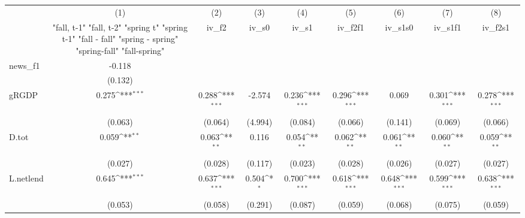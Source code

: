 {
\def\sym#1{\ifmmode^{#1}\else\(^{#1}\)\fi}
\begin{tabular}{l*{8}{c}}
\toprule
            &\multicolumn{1}{c}{(1)}&\multicolumn{1}{c}{(2)}&\multicolumn{1}{c}{(3)}&\multicolumn{1}{c}{(4)}&\multicolumn{1}{c}{(5)}&\multicolumn{1}{c}{(6)}&\multicolumn{1}{c}{(7)}&\multicolumn{1}{c}{(8)}\\
            &\multicolumn{1}{c}{  "fall, t-1" "fall, t-2" "spring t" "spring t-1"  "fall - fall" "spring - spring" "spring-fall" "fall-spring" }&\multicolumn{1}{c}{iv\_f2}&\multicolumn{1}{c}{iv\_s0}&\multicolumn{1}{c}{iv\_s1}&\multicolumn{1}{c}{iv\_f2f1}&\multicolumn{1}{c}{iv\_s1s0}&\multicolumn{1}{c}{iv\_s1f1}&\multicolumn{1}{c}{iv\_f2s1}\\
\midrule
news\_f1     &      -0.118         &                     &                     &                     &                     &                     &                     &                     \\
            &     (0.132)         &                     &                     &                     &                     &                     &                     &                     \\
\addlinespace
gRGDP       &       0.275\sym{***}&       0.288\sym{***}&      -2.574         &       0.236\sym{***}&       0.296\sym{***}&       0.069         &       0.301\sym{***}&       0.278\sym{***}\\
            &     (0.063)         &     (0.064)         &     (4.994)         &     (0.084)         &     (0.066)         &     (0.141)         &     (0.069)         &     (0.066)         \\
\addlinespace
D.tot       &       0.059\sym{**} &       0.063\sym{**} &       0.116         &       0.054\sym{**} &       0.062\sym{**} &       0.061\sym{**} &       0.060\sym{**} &       0.059\sym{**} \\
            &     (0.027)         &     (0.028)         &     (0.117)         &     (0.023)         &     (0.028)         &     (0.026)         &     (0.027)         &     (0.027)         \\
\addlinespace
L.netlend   &       0.645\sym{***}&       0.637\sym{***}&       0.504\sym{*}  &       0.700\sym{***}&       0.618\sym{***}&       0.648\sym{***}&       0.599\sym{***}&       0.638\sym{***}\\
            &     (0.053)         &     (0.058)         &     (0.291)         &     (0.087)         &     (0.059)         &     (0.068)         &     (0.075)         &     (0.059)         \\

\end{tabular}}
